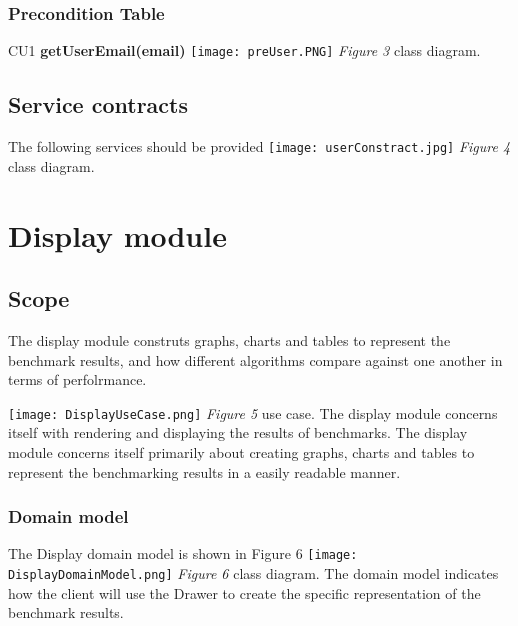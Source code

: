 \documentclass[runningheads,a4paper]{article}
\begin{document}
\subsubsection{\textbf{Precondition Table}}
CU1 \textbf{getUserEmail(email)}
\newline
\newline
\texttt{[image: preUser.PNG]}
\newline 
\textit{Figure 3} class diagram.

\subsection{\textbf{Service contracts}}
The following services should be provided
\newline
\newline
\texttt{[image: userConstract.jpg]}
\newline 
\textit{Figure 4} class diagram.

\section{Display module}
\subsection{Scope}
The display module construts graphs, charts and tables to represent the benchmark results, and how different algorithms 
compare against one another in terms of perfolrmance.

\texttt{[image: DisplayUseCase.png]}
\newline 
\textit{Figure 5} use case.
\newline
\newline
The display module concerns itself with rendering and displaying the results of benchmarks.
The display module concerns itself primarily about creating graphs, charts and tables to represent the
benchmarking results in a easily readable manner. 
\newline
\subsubsection{\textbf{Domain model}}
The Display domain model is shown in Figure 6
\newline
\newline
\texttt{[image: DisplayDomainModel.png]}
\newline 
\textit{Figure 6} class diagram.
\newline
The domain model indicates how the client will use the Drawer to create the specific representation of the benchmark results.
\newline
\end{document}
